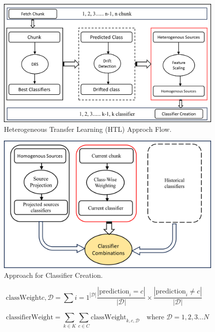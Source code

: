 \begin{figure}[!ht]
	\centering
	\includegraphics[width=1\linewidth]{6_transfer_learning/figures/alg1.png}
	\caption{Heterogeneous Transfer Learning (HTL) Approch Flow.}
	\label{fig:6_alg1}
\end{figure}
\begin{figure}[!ht]
	\centering
	\includegraphics[width=1\linewidth]{6_transfer_learning/figures/alg2.png}
	\caption{Approach for Classifier Creation.}
	\label{fig:6_alg2}
\end{figure}

\begin{equation}
	\label{eq:6_eq_1}
	\text{classWeight}{c,\mathcal{D}} = \sum{i=1}^{|\mathcal{D}|} \frac{|\text{prediction}_i = c|}{|\mathcal{D}|} \times \frac{|\text{prediction}_i \neq c|}{|\mathcal{D}|} \quad
\end{equation}

\begin{equation}
	\label{eq:6_eq_2}
	\text{classifierWeight} = \sum_{k \in K} \sum_{c \in C} \text{classWeight}_{k,c,\mathcal{D}} \quad \text{where } \mathcal{D} = 1,2,3 \dots N
\end{equation}

